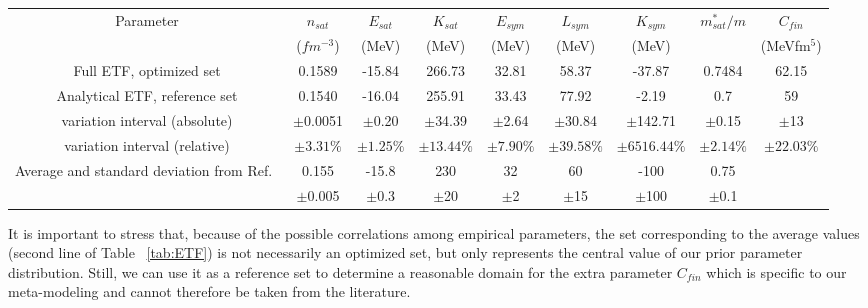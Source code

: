 \documentclass
[aps,prc,twocolumn,showpacs,showkeys,amsmath,floatfix,superscriptaddress]{revtex4}
\newcommand{\cred}{\color{red}}
\begin{document}
{\begin{table*}[tb]
\centering
\setlength{\tabcolsep}{2pt}
\renewcommand{\arraystretch}{1.2}
\begin{ruledtabular}
\caption{Empirical parameters used in the spherical ETF model, with different approximations (first and second line). %
For comparison, the average and standard variation of the different parameters recommended in 
Ref.~\cite{Casali1} is also given. 
}
\label{tab:ETF}
\begin{tabular}{ccccccccc}
  Parameter & $ n_{sat}$ & $E_{sat}$ & $K_{sat}$ & $E_{sym}$ & $L_{sym}$ & $K_{sym}$ & $m^*_{sat}/m$ & $C_{fin}$ %
\\
    {} & ($fm^{-3}$) & (MeV) & (MeV) & (MeV) & (MeV) & (MeV) & {}& (MeVfm$^5$)%
\\
 \hline
Full ETF, optimized set & 0.1589 & -15.84 & 266.73 & 32.81 & 58.37 & -37.87 & 0.7484 & 62.15 %
\\
\hline
 Analytical ETF, reference set & 0.1540 & -16.04 & 255.91 & 33.43 & 77.92 & -2.19 & 0.7  & 59%
\\
variation interval (absolute) & $\pm$0.0051 & $\pm$0.20 & $\pm$34.39 & $\pm$2.64 & $\pm$30.84 & $\pm$142.71 & $\pm$0.15&$\pm$13\\
variation interval (relative)  & $\pm 3.31 \%$ & $\pm 1.25\%$ & $\pm 13.44\%$ & $\pm 7.90\%$ & $\pm 39.58\%$ & $\pm 6516.44\%$ & $\pm 2.14\%$ & $\pm 22.03\%$ \\

\hline
Average and standard deviation from Ref.~\cite{Casali1} & 0.155 & -15.8 &  230 & 32 & 60 & -100 & 0.75 \\ & $\pm$0.005 & $\pm$0.3 & $\pm$20 & $\pm$2 & $\pm$15 & $\pm$100 & $\pm$0.1 \\ 
\end{tabular}
\end{ruledtabular}
\end{table*}
%





It is important to stress that, because of the possible correlations among empirical parameters, the set corresponding to the average values (second line of Table ~\ref{tab:ETF}) is not necessarily an optimized set, but only represents the central value of our prior parameter distribution. Still, we can use it as a reference set to determine a reasonable domain for the extra parameter $C_{fin}$ which is specific to our meta-modeling and cannot therefore be taken from the literature. 



}
\end{document}
